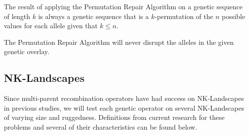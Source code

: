 \begin{thm}
The result of applying the Permutation Repair Algorithm on a genetic sequence of length $k$ is always a genetic sequence that is a $k$-permutation of the $n$ possible values for each allele given that $ k \leq n$.
\end{thm}

\begin{thm}
The Permutation Repair Algorithm will never disrupt the alleles in the given genetic overlay.
\end{thm}

%
%

\subsection*{NK-Landscapes}

Since multi-parent recombination operators have had success on NK-Landscapes in previous studies, we will test each genetic operator on several NK-Landscapes of varying size and ruggedness\cite{Eiben96,Skellett05}. Definitions from current research for these problems and several of their characteristics can be found below\cite{molga05,Skellett05,yang10}.
